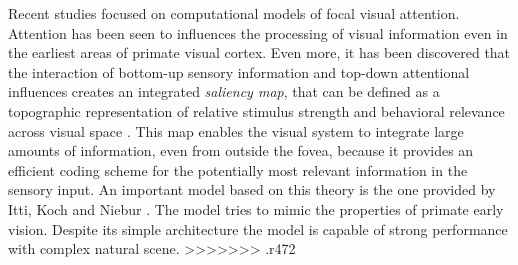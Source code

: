 Recent studies focused on computational models of focal visual attention. Attention has been seen to influences the processing of visual information even in the earliest areas of primate visual cortex. Even more, it has been discovered that the interaction of bottom-up sensory information and top-down attentional influences creates an integrated \textit{saliency map}, that can be defined as a topographic representation of relative stimulus strength and behavioral relevance across visual space \cite{Saliency_WWHW}. This map enables the visual system to integrate large amounts of information, even from outside the fovea, because it provides an efficient coding scheme for the potentially most relevant information in the sensory input.
An important model based on this theory is the one provided by Itti, Koch and Niebur \cite{Itti_review}\cite{Itti_model}. The model tries to mimic the properties of primate early vision. Despite its simple architecture the model is capable of strong performance with complex natural scene. >>>>>>> .r472
